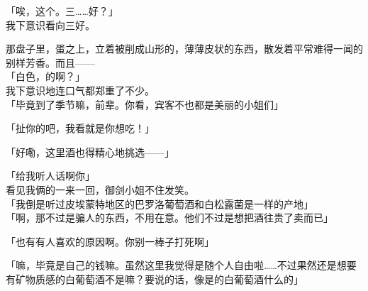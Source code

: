 「唉，这个。三……好？」\\

我下意识看向三好。

那盘子里，蛋之上，立着被削成山形的，薄薄皮状的东西，散发着平常难得一闻的别样芳香。而且——\\

「白色，的啊？」\\

我下意识地连口气都郑重了不少。\\

「毕竟到了季节嘛，前辈。你看，宾客不也都是美丽的小姐们」

「扯你的吧，我看就是你想吃！」

「好嘞，这里酒也得精心地挑选——」

「给我听人话啊你」\\

看见我俩的一来一回，御剑小姐不住发笑。\\

「我倒是听过皮埃蒙特地区的巴罗洛葡萄酒和白松露菌是一样的产地」\\

「啊，那不过是骗人的东西，不用在意。他们不过是想把酒往贵了卖而已」

「也有有人喜欢的原因啊。你别一棒子打死啊」

「嘛，毕竟是自己的钱嘛。虽然这里我觉得是随个人自由啦……不过果然还是想要有矿物质感的白葡萄酒不是嘛？要说的话，像是的白葡萄酒什么的」

